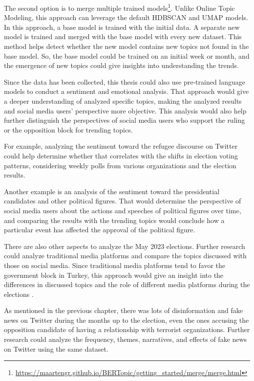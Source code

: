 The second option is to merge multiple trained 
models\footnote{\url{https://maartengr.github.io/BERTopic/getting_started/merge/merge.html}}. Unlike 
Online Topic Modeling, this approach can leverage the default HDBSCAN and UMAP models. In this 
approach, a base model is trained with the initial data. A separate new model is trained and 
merged with the base model with every new dataset. This method helps detect whether the new model 
contains new topics not found in the base model. So, the base model could be trained on an 
initial week or month, and the emergence of new topics could give insights into understanding the 
trends.  

Since the data has been collected, this thesis could also use pre-trained language models to 
conduct a sentiment and emotional analysis. That approach would give a deeper understanding of 
analyzed specific topics, making the analyzed results and social media users' perspective more 
objective. This analysis would also help further distinguish the perspectives of social media users 
who support the ruling or the opposition block for trending topics. 

For example, analyzing the sentiment toward the refugee discourse on Twitter could help determine 
whether that correlates with the shifts in election voting patterns, considering weekly polls 
from various organizations and the election results.

Another example is an analysis of the sentiment toward the presidential candidates and other 
political figures. That would determine the perspective of social media users about the actions 
and speeches of political figures over time, and comparing the results with the trending topics 
would conclude how a particular event has affected the approval of the political figure.

There are also other aspects to analyze the May 2023 elections. Further research could analyze 
traditional media platforms and compare the topics discussed with those on social media. Since 
traditional media platforms tend to favor the government block in Turkey, this approach would 
give an insight into the differences in discussed topics and the role of different media platforms 
during the elections \parencite{freedom-house_turkey_report}. 

As mentioned in the previous chapter, there was lots of disinformation and fake news on Twitter 
during the months up to the election, even the ones accusing the opposition candidate of having a 
relationship with terrorist organizations. Further research could analyze the frequency, themes, 
narratives, and effects of fake news on Twitter using the same dataset.

